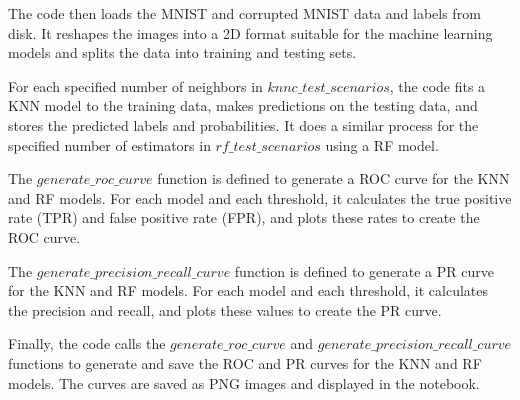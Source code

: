 The code then loads the MNIST and corrupted MNIST data and labels from disk. 
It reshapes the images into a 2D format suitable for the machine learning models and splits the data into training and testing sets.\par

For each specified number of neighbors in $knnc\_test\_scenarios$, the code fits a KNN model to the training data, makes predictions on the testing data, and stores the predicted labels and probabilities. 
It does a similar process for the specified number of estimators in $rf\_test\_scenarios$ using a RF model.\par

The $generate\_roc\_curve$ function is defined to generate a ROC curve for the KNN and RF models. 
For each model and each threshold, it calculates the true positive rate (TPR) and false positive rate (FPR), and plots these rates to create the ROC curve.\par

The $generate\_precision\_recall\_curve$ function is defined to generate a PR curve for the KNN and RF models. 
For each model and each threshold, it calculates the precision and recall, and plots these values to create the PR curve.\par

Finally, the code calls the $generate\_roc\_curve$ and $generate\_precision\_recall\_curve$ functions to generate and save the ROC and PR curves for the KNN and RF models. The curves are saved as PNG images and displayed in the notebook.\par






